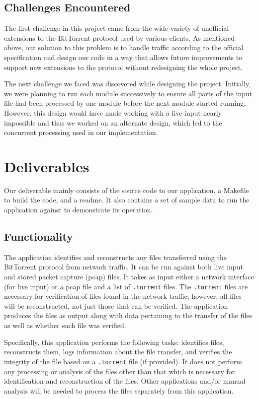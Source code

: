 \documentclass{acm_proc_article-sp}
\begin{document}
\subsection{Challenges Encountered}
The first challenge in this project came from the wide variety of unofficial
extensions to the BitTorrent protocol used by various clients. As mentioned
above, our solution to this problem is to handle traffic according to the
official specification and design our code in a way that allows future
improvements to support new extensions to the protocol without redesigning the
whole project.

The next challenge we faced was discovered while designing the project.
Initially, we were planning to run each module successively to ensure all parts
of the input file had been processed by one module before the next module
started running. However, this design would have made working with a live input
nearly impossible and thus we worked on an alternate design, which led to the
concurrent processing used in our implementation.

\section{Deliverables}
Our deliverable mainly consists of the source code to our application, a
Makefile to build the code, and a readme. It also contains a set of sample data
to run the application against to demonstrate its operation.
\subsection{Functionality}
The application identifies and reconstructs any files transferred using the
BitTorrent protocol from network traffic. It can be run against both live input
and stored packet capture (pcap) files. It takes as input either a network
interface (for live input) or a pcap file and a list of \texttt{.torrent}
files. The \texttt{.torrent} files are necessary for verification of files
found in the network traffic; however, all files will be reconstructed, not
just those that can be verified. The application produces the files as output
along with data pertaining to the transfer of the files as well as whether each
file was verified.

Specifically, this application performs the following tasks: identifies files,
reconstructs them, logs information about the file transfer, and verifies the
integrity of the file based on a \texttt{.torrent} file (if provided). It does not
perform any processing or analysis of the files other than that which is
necessary for identification and reconstruction of the files. Other
applications and/or manual analysis will be needed to process the files
separately from this application.
\end{document}
